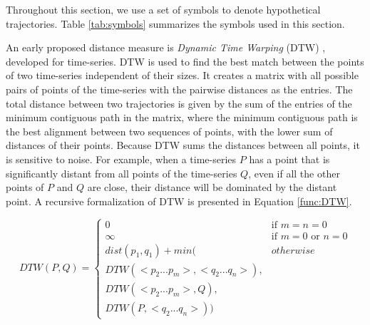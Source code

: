 Throughout this section, we use a set of symbols to denote hypothetical trajectories. Table \ref{tab:symbols} summarizes the symbols used in this section.

\begin{table}[!h]
    \centering
    \caption{Symbol meanings}
    \label{tab:symbols}
\end{table}

An early proposed distance measure is \emph{Dynamic Time Warping} (DTW) \cite{berndt1994using}, developed for time-series. DTW is used to find the best match between the points of two time-series independent of their sizes. It creates a matrix with all possible pairs of points of the time-series with the pairwise distances as the entries.
The total distance between two trajectories is given by the sum of the entries of the minimum contiguous path in the matrix{, where the minimum contiguous path is the best alignment between two sequences of points, with the lower sum of distances of their points}. Because DTW sums the distances between all points, it is sensitive to noise. For example, when a time-series $P$ has a point that is significantly distant from all points of the time-series $Q$, even if all the other points of $P$ and $Q$ are close, their distance will be dominated by the distant point. A recursive formalization of DTW is presented in Equation \ref{func:DTW}.

\begin{equation}
\label{func:DTW}
  DTW(P, Q) = 
    \begin{cases} 
        0 & \text{if } m = n = 0\\ 
      \infty & \text{if } m = 0 \text{ or } n = 0\\ 
      dist(p_1, q_1) + min( & otherwise\\
      DTW(<p_2...p_m>,<q_2...q_n>),\\
      DTW(<p_2...p_m>, Q), \\
      DTW(P, <q_2...q_n>)) &
    \end{cases}
\end{equation}

